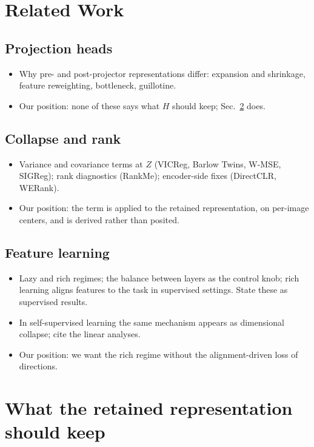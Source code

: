 \documentclass[11pt]{article}
\numberwithin{equation}{section}
\theoremstyle{definition}
\theoremstyle{remark}
\begin{document}
\section{Related Work}

\subsection{Projection heads}
\begin{itemize}
    \item Why pre- and post-projector representations differ: expansion and shrinkage,
    feature reweighting, bottleneck, guillotine.
    \item Our position: none of these says what \(H\) should keep; Sec.~\ref{sec:what}
    does.
\end{itemize}

\subsection{Collapse and rank}
\begin{itemize}
    \item Variance and covariance terms at \(Z\) (VICReg, Barlow Twins, W-MSE, SIGReg);
    rank diagnostics (RankMe); encoder-side fixes (DirectCLR, WERank).
    \item Our position: the term is applied to the retained representation, on per-image
    centers, and is derived rather than posited.
\end{itemize}

\subsection{Feature learning}
\begin{itemize}
    \item Lazy and rich regimes; the balance between layers as the control knob; rich
    learning aligns features to the task in supervised settings. State these as
    supervised results.
    \item In self-supervised learning the same mechanism appears as dimensional collapse;
    cite the linear analyses.
    \item Our position: we want the rich regime without the alignment-driven loss of
    directions.
\end{itemize}


\section{What the retained representation should keep}\label{sec:what}
\end{document}
